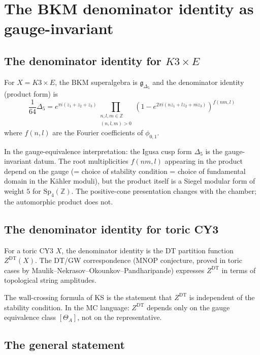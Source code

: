 \documentclass[11pt]{article}
\theoremstyle{definition}
\theoremstyle{remark}
\newcommand{\frakg}{\mathfrak{g}}
\newcommand{\DT}{\mathrm{DT}}
\begin{document}
\section{The BKM denominator identity as gauge-invariant}
\label{sec:bkm-gauge-inv}

\subsection{The denominator identity for $K3 \times E$}
\label{ssec:denom-k3e}

For $X = K3 \times E$, the BKM superalgebra is $\frakg_{\Delta_5}$
and the denominator identity (product form) is
\begin{equation}\label{eq:denom-k3e}
 \frac{1}{64} \Delta_5
 = e^{\pi i(z_1 + z_2 + z_3)}
 \prod_{\substack{n,l,m \in \mathbb{Z} \\ (n,l,m) > 0}}
 (1 - e^{2\pi i(nz_1 + lz_2 + mz_3)})^{f(nm,l)}
\end{equation}
where $f(n,l)$ are the Fourier coefficients of $\phi_{0,1}$.

In the gauge-equivalence interpretation: the Igusa cusp form $\Delta_5$ is
the gauge-invariant datum. The root multiplicities $f(nm,l)$ appearing
in the product depend on the gauge (= choice of stability condition =
choice of fundamental domain in the K\"ahler moduli), but the product
itself is a Siegel modular form of weight $5$ for $\mathrm{Sp}_4(\mathbb{Z})$.
The positive-cone presentation changes with the chamber; the automorphic
product does not.

\subsection{The denominator identity for toric CY3}
\label{ssec:denom-toric}

For a toric CY3 $X$, the denominator identity is the DT partition
function $Z^{\DT}(X)$. The DT/GW correspondence (MNOP conjecture, proved
in toric cases by Maulik--Nekrasov--Okounkov--Pandharipande) expresses
$Z^{\DT}$ in terms of topological string amplitudes.

The wall-crossing formula of KS is the statement that $Z^{\DT}$ is
independent of the stability condition. In the MC language: $Z^{\DT}$
depends only on the gauge equivalence class $[\Theta_A]$, not on the
representative.

\subsection{The general statement}
\label{ssec:general-euler-inv}
\end{document}
